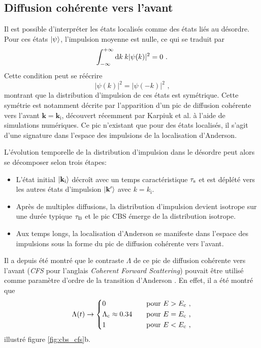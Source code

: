 \subsection{Diffusion cohérente vers l'avant}
Il est possible d'interpréter les états localisés comme des états liés au désordre. Pour ces états $\left| \psi \right\rangle$, l'impulsion moyenne est nulle, ce qui se traduit par
\begin{equation}
\int_{-\infty}^{+\infty}{\mathop{}\mathopen{}\mathrm{d} k \: k |\psi(k)|^2}=0 \text{ .}
\end{equation}
Cette condition peut se réécrire 
\begin{equation}
|\psi(k)|^2=|\psi(-k)|^2 \text{ ,}
\end{equation}
montrant que la distribution d'impulsion de ces états est symétrique. Cette symétrie est notamment décrite par l'apparition d'un pic de diffusion cohérente vers l'avant $\mathbf{k}=\mathbf{k}_{\mathrm{i}}$, découvert récemment par Karpiuk et al. \citep{karpiuk2012coherent} à l'aide de simulations numériques. Ce pic n'existant que pour des états localisés, il s'agit d'une signature dans l'espace des impulsions de la localisation d'Anderson.

L'évolution temporelle de la distribution d'impulsion dans le désordre peut alors se décomposer selon trois étapes:
\begin{itemize}
\item[\textendash] L'état initial $\left| \mathbf{k}_{\mathrm{i}} \right\rangle$ décroît avec un temps caractéristique $\tau_{\mathrm{s}}$ et est déplété vers les autres états d'impulsion $\left| \mathbf{k}' \right\rangle$ avec $k=k_{\mathrm{i}}$. 
\item[\textendash] Après de multiples diffusions, la distribution d'impulsion devient isotrope sur une durée typique $\tau_{\mathrm{B}}$ et le pic CBS émerge de la distribution isotrope. 
\item[\textendash] Aux temps longs, la localisation d'Anderson se manifeste dans l'espace des impulsions sous la forme du pic de diffusion cohérente vers l'avant.
\end{itemize}

Il a depuis été montré que le contraste $\Lambda$ de ce pic de diffusion cohérente vers l'avant (\emph{CFS} pour l'anglais \emph{Coherent Forward Scattering}) pouvait être utilisé comme paramètre d'ordre de la transition d'Anderson \citep{ghosh2017coherent}. En effet, il a été montré que 
\begin{equation}
\Lambda(t) \rightarrow \left\lbrace \begin{aligned}
& 0  \quad &&\text{pour } E>E_{\mathrm{c}} \text{ ,}\\
& \Lambda_{\mathrm{c}}\approx 0.34 \quad &&\text{pour } E=E_{\mathrm{c}} \text{ ,}\\
& 1 \quad &&\text{pour } E<E_{\mathrm{c}} \text{ ,}
\end{aligned}\right.
\label{eq:contraste_cfs}
\end{equation}
illustré figure \ref{fig:cbs_cfs}b.

